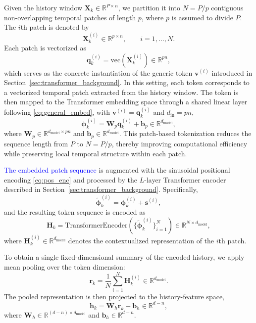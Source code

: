 \documentclass[journal]{IEEEtran}
\newcommand{\vh}{\mathbf{h}}
\newcommand{\vr}{\mathbf{r}}
\newcommand{\vs}{\mathbf{s}}
\newcommand{\vb}{\mathbf{b}}
\newcommand{\vphi}{\boldsymbol{\phi}}
\newcommand{\vq}{\mathbf{q}}
\newcommand{\mW}{\mathbf{W}}
\newcommand{\mX}{\mathbf{X}}
\newcommand{\mH}{\mathbf{H}}
\begin{document}
Given the history window $\mX_k \in \mathbb{R}^{P \times n}$, we
partition it into $N = P/p$ contiguous non-overlapping temporal patches
of length $p$, where $p$ is assumed to divide $P$. The $i$th patch is
denoted by
\begin{equation}
    \mX_k^{(i)} \in \mathbb{R}^{p \times n}, \qquad i=1,\ldots,N.
\end{equation}
Each patch is vectorized as
\begin{equation}
    \vq_k^{(i)} = \mathrm{vec}(\mX_k^{(i)}) \in \mathbb{R}^{pn},
    \label{eq:patch_vec}
\end{equation}
which serves as the concrete instantiation of the generic token
$\mathbf{v}^{(i)}$ introduced in Section~\ref{sec:transformer_background}.
In this setting, each token corresponds to a vectorized temporal patch
extracted from the history window. The token is then mapped to the
Transformer embedding space through a shared linear layer following
\eqref{eq:general_embed}, with $\mathbf{v}^{(i)} = \vq_k^{(i)}$ and
$d_{\mathrm{in}} = pn$,
\begin{equation}
    \vphi_k^{(i)} = \mW_p \vq_k^{(i)} + \vb_p
    \in \mathbb{R}^{d_{\mathrm{model}}},
    \label{eq:patch_embedding}
\end{equation}
where $\mW_p \in \mathbb{R}^{d_{\mathrm{model}} \times pn}$ and
$\vb_p \in \mathbb{R}^{d_{\mathrm{model}}}$. This patch-based
tokenization reduces the sequence length from $P$ to $N=P/p$, thereby
improving computational efficiency while preserving local temporal
structure within each patch.

\textcolor{blue}{The embedded patch sequence} is augmented with
the sinusoidal positional encoding \eqref{eq:pos_enc} and processed by
the $L$-layer Transformer encoder described in
Section~\ref{sec:transformer_background}. Specifically,
\begin{equation}
    \tilde{\vphi}_k^{(i)} = \vphi_k^{(i)} + \vs^{(i)},
    \label{eq:pos_enc_applied}
\end{equation}
and the resulting token sequence is encoded as
\begin{equation}
    \mH_k = \mathrm{TransformerEncoder}\!\left(
        \{\tilde{\vphi}_k^{(i)}\}_{i=1}^{N}
    \right) \in \mathbb{R}^{N \times d_{\mathrm{model}}},
    \label{eq:transformer_enc}
\end{equation}
where $\mH_k^{(i)} \in \mathbb{R}^{d_{\mathrm{model}}}$ denotes the
contextualized representation of the $i$th patch.

To obtain a single fixed-dimensional summary of the encoded history,
we apply mean pooling over the token dimension:
\begin{equation}
    \vr_k = \frac{1}{N}\sum_{i=1}^{N} \mH_k^{(i)}
    \in \mathbb{R}^{d_{\mathrm{model}}}.
    \label{eq:pooling}
\end{equation}
The pooled representation is then projected to the history-feature space,
\begin{equation}
    \vh_k = \mW_h \vr_k + \vb_h \in \mathbb{R}^{d-n},
    \label{eq:history_feature}
\end{equation}
where $\mW_h \in \mathbb{R}^{(d-n)\times d_{\mathrm{model}}}$ and
$\vb_h \in \mathbb{R}^{d-n}$.
\end{document}
